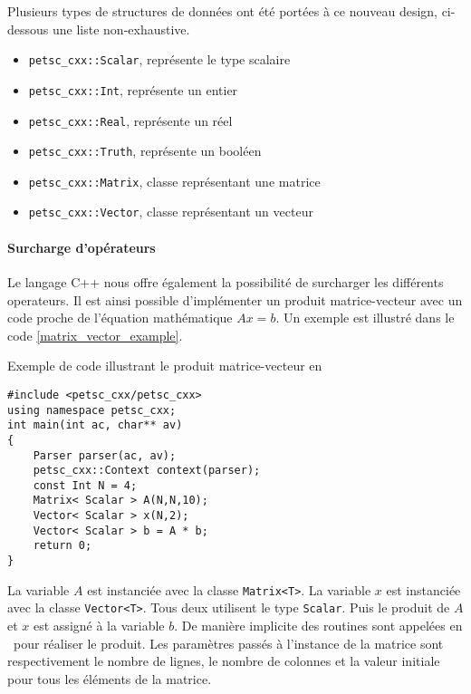 Plusieurs types de structures de données ont été portées à ce nouveau design, ci-dessous une liste non-exhaustive.

\begin{itemize}
\item \verb#petsc_cxx::Scalar#, représente le type scalaire
\item \verb#petsc_cxx::Int#, représente un entier
\item \verb#petsc_cxx::Real#, représente un réel
\item \verb#petsc_cxx::Truth#, représente un booléen
\item \verb#petsc_cxx::Matrix#, classe représentant une matrice \petsc
\item \verb#petsc_cxx::Vector#, classe représentant un vecteur \petsc
\end{itemize}

\paragraph{Surcharge d'opérateurs}

Le langage C++ nous offre également la possibilité de surcharger les différents operateurs. Il est ainsi possible d'implémenter un produit matrice-vecteur avec un code proche de l'équation mathématique $Ax = b$. Un exemple est illustré dans le code \ref{matrix_vector_example}.

\begin{algorithm}[h]
  \caption{Exemple de code illustrant le produit matrice-vecteur en \petscx}
  \label{matrix_vector_example}
\begin{verbatim}
#include <petsc_cxx/petsc_cxx>
using namespace petsc_cxx;
int main(int ac, char** av)
{
    Parser parser(ac, av);
    petsc_cxx::Context context(parser);
    const Int N = 4;
    Matrix< Scalar > A(N,N,10);
    Vector< Scalar > x(N,2);
    Vector< Scalar > b = A * b;
    return 0;
}
\end{verbatim}
\end{algorithm}

La variable $A$ est instanciée avec la classe \verb#Matrix<T>#. La variable $x$ est instanciée avec la classe \verb#Vector<T>#. Tous deux utilisent le type \verb#Scalar#. Puis le produit de $A$ et $x$ est assigné à la variable $b$. De manière implicite des routines sont appelées en \petsc\ pour réaliser le produit. Les paramètres passés à l'instance de la matrice sont respectivement le nombre de lignes, le nombre de colonnes et la valeur initiale pour tous les éléments de la matrice.
